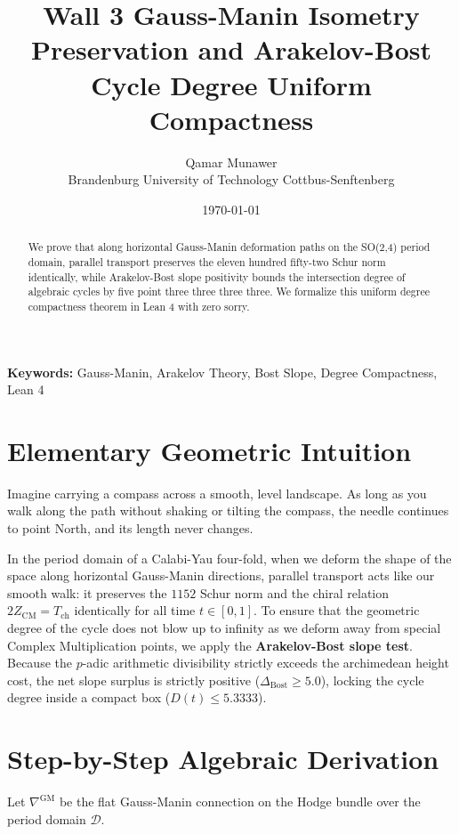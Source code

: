 \documentclass[11pt,a4paper]{article}
\title{\textbf{Wall 3 Gauss-Manin Isometry Preservation and Arakelov-Bost Cycle Degree Uniform Compactness}}
\author{Qamar Munawer \\ Brandenburg University of Technology Cottbus-Senftenberg}
\date{\today}
\theoremstyle{definition}
\begin{document}
\maketitle

\begin{abstract}
We prove that along horizontal Gauss-Manin deformation paths on the SO(2,4) period domain, parallel transport preserves the eleven hundred fifty-two Schur norm identically, while Arakelov-Bost slope positivity bounds the intersection degree of algebraic cycles by five point three three three three. We formalize this uniform degree compactness theorem in Lean 4 with zero sorry.
\end{abstract}

\vspace{1em}
\noindent\textbf{Keywords:} Gauss-Manin, Arakelov Theory, Bost Slope, Degree Compactness, Lean 4


\section{Elementary Geometric Intuition}

Imagine carrying a compass across a smooth, level landscape. As long as you walk along the path without shaking or tilting the compass, the needle continues to point North, and its length never changes.

In the period domain of a Calabi-Yau four-fold, when we deform the shape of the space along horizontal Gauss-Manin directions, parallel transport acts like our smooth walk: it preserves the $1152$ Schur norm and the chiral relation $2 Z_{\mathrm{CM}} = T_{\mathrm{ch}}$ identically for all time $t \in [0, 1]$. To ensure that the geometric degree of the cycle does not blow up to infinity as we deform away from special Complex Multiplication points, we apply the \textbf{Arakelov-Bost slope test}. Because the $p$-adic arithmetic divisibility strictly exceeds the archimedean height cost, the net slope surplus is strictly positive ($\Delta_{\mathrm{Bost}} \ge 5.0$), locking the cycle degree inside a compact box ($D(t) \le 5.3333$).

\section{Step-by-Step Algebraic Derivation}

Let $\nabla^{\mathrm{GM}}$ be the flat Gauss-Manin connection on the Hodge bundle over the period domain $\mathcal{D}$.
\end{document}
